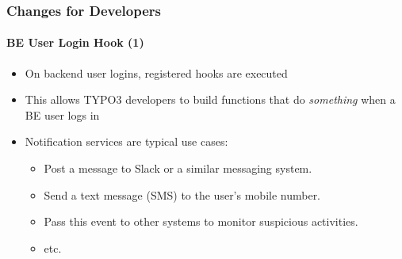 
\begin{frame}[fragile]
	\frametitle{Changes for Developers}
	\framesubtitle{BE User Login Hook (1)}

	\lstset{basicstyle=\tiny\ttfamily}

	\begin{itemize}
		\item On backend user logins, registered hooks are executed
		\item This allows TYPO3 developers to build functions that do
			\textit{something} when a BE user logs in

		\item Notification services are typical use cases:

			\begin{itemize}
				\item Post a message to Slack or a similar messaging system.
				\item Send a text message (SMS) to the user's mobile number.
				\item Pass this event to other systems to monitor suspicious activities.
				\item etc.
			\end{itemize}

	\end{itemize}

\end{frame}


